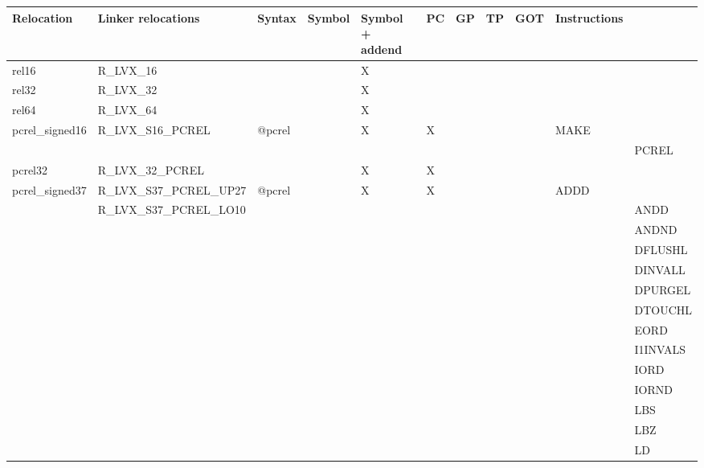 {\tiny
\begin{tabular}{|l|l|l|l|l|l|l|l|l|l|l|} \hline
\textsf{Relocation} & \textsf{Linker relocations} & \textsf{Syntax} & \textsf{Symbol} & \textsf{Symbol + addend} & \textsf{PC} & \textsf{GP} & \textsf{TP} & \textsf{GOT} & \textsf{Instructions} \\
\hline
\textsf{rel16} & \textsf{R\_LVX\_16} & \textsf{} & \textsf{} & \textsf{X} & \textsf{} & \textsf{} & \textsf{} & \textsf{} & \textsf{} \\
\hline
\textsf{rel32} & \textsf{R\_LVX\_32} & \textsf{} & \textsf{} & \textsf{X} & \textsf{} & \textsf{} & \textsf{} & \textsf{} & \textsf{} \\
\hline
\textsf{rel64} & \textsf{R\_LVX\_64} & \textsf{} & \textsf{} & \textsf{X} & \textsf{} & \textsf{} & \textsf{} & \textsf{} & \textsf{} \\
\hline
\textsf{pcrel\_signed16} & \textsf{R\_LVX\_S16\_PCREL} & \textsf{@pcrel} & \textsf{} & \textsf{X} & \textsf{X} & \textsf{} & \textsf{} & \textsf{} & \textsf{MAKE} \\
 & & & & & & & & & & \textsf{PCREL} \\
\hline
\textsf{pcrel32} & \textsf{R\_LVX\_32\_PCREL} & \textsf{} & \textsf{} & \textsf{X} & \textsf{X} & \textsf{} & \textsf{} & \textsf{} & \textsf{} \\
\hline
\textsf{pcrel\_signed37} & \textsf{R\_LVX\_S37\_PCREL\_UP27} & \textsf{@pcrel} & \textsf{} & \textsf{X} & \textsf{X} & \textsf{} & \textsf{} & \textsf{} & \textsf{ADDD} \\
 & \textsf{R\_LVX\_S37\_PCREL\_LO10} & & & & & & & & & \textsf{ANDD} \\
 & & & & & & & & & & \textsf{ANDND} \\
 & & & & & & & & & & \textsf{DFLUSHL} \\
 & & & & & & & & & & \textsf{DINVALL} \\
 & & & & & & & & & & \textsf{DPURGEL} \\
 & & & & & & & & & & \textsf{DTOUCHL} \\
 & & & & & & & & & & \textsf{EORD} \\
 & & & & & & & & & & \textsf{I1INVALS} \\
 & & & & & & & & & & \textsf{IORD} \\
 & & & & & & & & & & \textsf{IORND} \\
 & & & & & & & & & & \textsf{LBS} \\
 & & & & & & & & & & \textsf{LBZ} \\
 & & & & & & & & & & \textsf{LD} \\

\end{tabular}}
